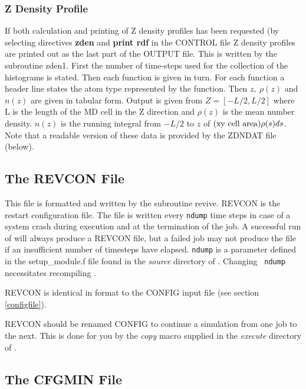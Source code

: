 \subsubsection{ Z Density Profile}
If both calculation and printing of Z density profiles has been
requested (by selecting directives {\bf zden} and {\bf print rdf} in
the CONTROL file Z density profiles are printed out as the last part
of the OUTPUT file.  This is written by the subroutine {\sc zden1}.
First the number of time-steps used for the collection of the
histograms is stated.  Then each function is given in turn. For each
function a header line states the atom type represented by the
function.  Then $z,~\rho(z)$ and $n(z)$ are given in tabular form.
Output is given from $Z = [-L/2,L/2]$ where L is the length of the MD
cell in the Z direction and $\rho(z)$ is the mean number density.
$n(z)$ is the running integral from $-L/2$ to $z$ of $({\rm
xy~cell~area})\rho(s) ds$.
Note that a readable version of these data is provided by the 
ZDNDAT file (below). 

\subsection{The REVCON File}
\label{revconfile}

This file is formatted and written by the subroutine {\sc revive}.
REVCON is the restart configuration file.  The file is written every
{\tt ndump} time steps in case of a system crash during execution and
at the termination of the job. A successful run of \D{} will always
produce a REVCON file, but a failed job may not produce the file if an
insufficient number of timesteps have elapsed. {\tt ndump} is a
parameter defined in the {\sc setup\_module.f} file found in the {\em
source} directory of \D{}.  Changing {\tt
ndump} necessitates recompiling \D{}.  

REVCON is identical in format to the CONFIG input file (see section
\ref{configfile}).

REVCON should be renamed CONFIG to continue a simulation from one job
to the next.  This is done for you by the {\sl copy} macro supplied in
the {\em execute} directory of \D{}.

\subsection{The CFGMIN File}
\label{cfgminfile}

